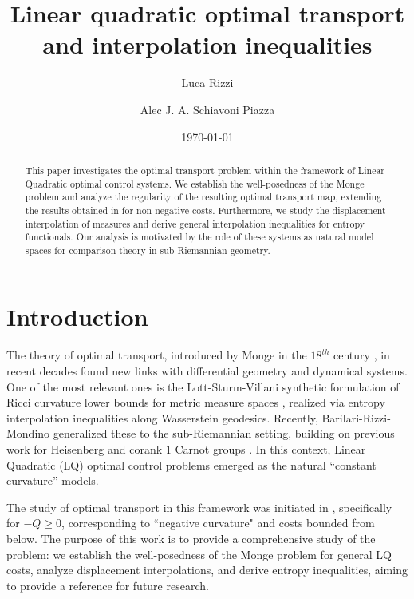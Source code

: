 \documentclass[reqno]{amsart}
\title[LQ optimal transport and interpolation inequalities]{Linear quadratic optimal transport and interpolation inequalities}
\author{Luca Rizzi}
\author{Alec J. A. Schiavoni Piazza}
\date{\today}
\theoremstyle{plain}
\theoremstyle{definition}
\theoremstyle{remark}
\begin{document}
\begin{abstract}
This paper investigates the optimal transport problem within the framework of Linear Quadratic optimal control systems. We establish the well-posedness of the Monge problem and analyze the regularity of the resulting optimal transport map, extending the results obtained in \cite{hinpomriff2011} for non-negative costs. Furthermore, we study the displacement interpolation of measures and derive general interpolation inequalities for entropy functionals. Our analysis is motivated by the role of these systems as natural model spaces for comparison theory in sub-Riemannian geometry.
\end{abstract}

\maketitle
\tableofcontents

\section{Introduction}
		The theory of optimal transport, introduced by Monge in the $18^{th}$ century \cite{monge1781}, in recent decades found new links with differential geometry and dynamical systems. One of the most relevant ones is the Lott-Sturm-Villani synthetic formulation of Ricci curvature lower bounds for metric measure spaces \cite{lott2006riccicurvmmspaces,SturmGeomMmsI,SturmGeomMmsII}, realized via entropy interpolation inequalities along Wasserstein geodesics. Recently, Barilari-Rizzi-Mondino \cite{Barilari_2016,SRintineq,BakriEmeryandmodelspaces,UnifiedsyntheticRicci} generalized these to the sub-Riemannian setting, building on previous work for Heisenberg and corank $1$ Carnot groups \cite{balogh2018geometricinequalitiesheisenberggroups,balogh2019jacobiandeterminantinequalitycorank}. In this context, Linear Quadratic (LQ) optimal control problems \cite{agrachev2013control, Jurdjevic1996GeometricCT} emerged as the natural ``constant curvature'' models.
		
		The study of optimal transport in this framework was initiated in \cite{hinpomriff2011}, specifically for $-Q \geq 0$, corresponding to ``negative curvature" and costs bounded from below. The purpose of this work is to provide a comprehensive study of the problem: we establish the well-posedness of the Monge problem for general LQ costs, analyze displacement interpolations, and derive entropy inequalities, aiming to provide a reference for future research.
		
\end{document}
